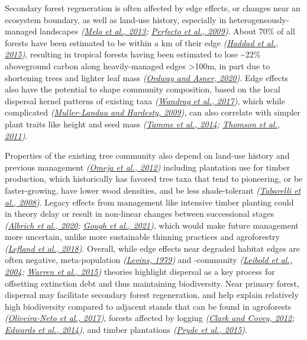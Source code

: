 \documentclass[
  12pt,
]{article}
\begin{document}
Secondary forest regeneration is often affected by edge effects, or changes near an ecosystem boundary, as well as land-use history, especially in heterogeneously-managed landscapes \emph{(\protect\hyperlink{ref-melo13}{Melo et al., 2013}; \protect\hyperlink{ref-perfecto09}{Perfecto et al., 2009})}.
About 70\% of all forests have been estimated to be within a km of their edge \emph{(\protect\hyperlink{ref-haddad15}{Haddad et al., 2015})}, resulting in tropical forests having been estimated to lose \textasciitilde22\% aboveground carbon along heavily-managed edges \textgreater100m, in part due to shortening trees and lighter leaf mass \emph{(\protect\hyperlink{ref-ordway20}{Ordway and Asner, 2020})}.
Edge effects also have the potential to shape community composition, based on the local dispersal kernel patterns of existing taxa \emph{(\protect\hyperlink{ref-wandrag17}{Wandrag et al., 2017})}, which while complicated \emph{(\protect\hyperlink{ref-muller-landau09}{Muller-Landau and Hardesty, 2009})}, can also correlate with simpler plant traits like height and seed mass \emph{(\protect\hyperlink{ref-tamme14}{Tamme et al., 2014}; \protect\hyperlink{ref-thomson11}{Thomson et al., 2011})}.

Properties of the existing tree community also depend on land-use history and previous management \emph{(\protect\hyperlink{ref-omeja12}{Omeja et al., 2012})} including plantation use for timber production, which historically has favored tree taxa that tend to pioneering, or be faster-growing, have lower wood densities, and be less shade-tolerant \emph{(\protect\hyperlink{ref-tabarelli08}{Tabarelli et al., 2008})}.
Legacy effects from management like intensive timber planting could in theory delay or result in non-linear changes between successional stages \emph{(\protect\hyperlink{ref-albrich20}{Albrich et al., 2020}; \protect\hyperlink{ref-gough21}{Gough et al., 2021})}, which would make future management more uncertain, unlike more sustainable thinning practices and agroforestry \emph{(\protect\hyperlink{ref-lefland18}{Lefland et al., 2018})}.
Overall, while edge effects near degraded habitat edges are often negative, meta-population \emph{(\protect\hyperlink{ref-levins79}{Levins, 1979})} and -community \emph{(\protect\hyperlink{ref-leibold04}{Leibold et al., 2004}; \protect\hyperlink{ref-warren15}{Warren et al., 2015})} theories highlight dispersal as a key process for offsetting extinction debt and thus maintaining biodiversity.
Near primary forest, dispersal may facilitate secondary forest regeneration, and help explain relatively high biodiversity compared to adjacent stands that can be found in agroforests \emph{(\protect\hyperlink{ref-oliveira-neto17}{Oliveira-Neto et al., 2017})}, forests affected by logging \emph{(\protect\hyperlink{ref-clark12}{Clark and Covey, 2012}; \protect\hyperlink{ref-edwards14}{Edwards et al., 2014})}, and timber plantations \emph{(\protect\hyperlink{ref-pryde15}{Pryde et al., 2015})}.
\end{document}
